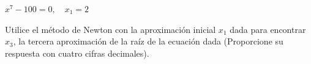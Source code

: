 \item $x^7 - 100 = 0, \quad x_1 = 2$
\par
Utilice el método de Newton con la aproximación inicial $x_1$ dada para encontrar $x_3$, la tercera aproximación de la raíz de la ecuación dada (Proporcione su respuesta con cuatro cifras decimales).
